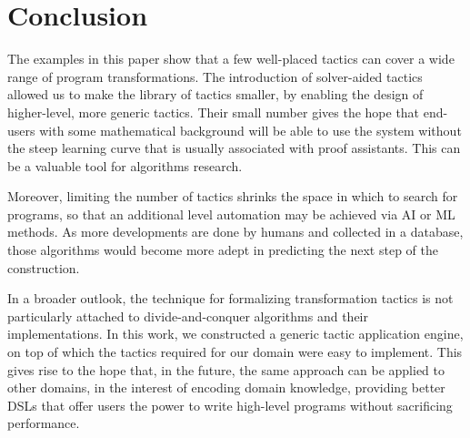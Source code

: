 \section{Conclusion}
\label{conc}

The examples in this paper show that a few well-placed tactics can cover a wide range
of program transformations. The introduction of solver-aided tactics allowed us to make
the library of tactics smaller, by enabling the design of higher-level, more generic
tactics. Their small number gives the hope that end-users with some mathematical background
will be able to use the system without the steep learning curve that is usually associated
with proof assistants. This can be a valuable tool for algorithms research.

Moreover, limiting the number of tactics shrinks the space in which to search for programs,
so that an additional level automation may be achieved via AI or ML methods. As more
developments are done by humans and collected in a database, those algorithms would become
more adept in predicting the next step of the construction.

In a broader outlook, the technique for formalizing transformation tactics is not
particularly attached to divide-and-conquer algorithms and their implementations.
In this work, we constructed a generic tactic application engine, on top of which
the tactics required for our domain were easy to implement.
This gives rise to the hope that, in the future, the same approach can be applied
to other domains, in the interest of encoding domain knowledge, providing better
DSLs that offer users the power to write high-level programs without sacrificing
performance.
